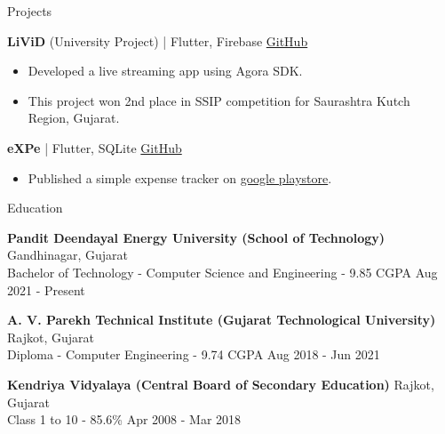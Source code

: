 \documentclass{resume}
\begin{document}
\begin{rSection}{Projects}
    \item \textbf{LiViD} (University Project) | {Flutter, Firebase}
    \hfill \href{https://github.com/JayNakum/LiViD}{GitHub}
    \begin{itemize}
        \setlength\itemsep{-0.5em}
        \item Developed a live streaming app using Agora SDK.
        \item This project won 2nd place in SSIP competition for Saurashtra Kutch Region, Gujarat.
    \end{itemize}

    \item \textbf{eXPe} | {Flutter, SQLite}
    \hfill \href{https://github.com/JayNakum/eXPe}{GitHub}
    \begin{itemize}
        \setlength\itemsep{-0.5em}
        \item Published a simple expense tracker on \href{https://play.google.com/store/apps/details?id=io.github.jaynakum.expe&pcampaignid=pcampaignidMKT-Other-global-all-co-prtnr-py-PartBadge-Mar2515-1}{google playstore}.
    \end{itemize}
\end{rSection}

\begin{rSection}{Education}
\vspace{-1em}
    \item \textbf{Pandit Deendayal Energy University (School of Technology)}
    \hfill Gandhinagar, Gujarat
    \\ Bachelor of Technology - Computer Science and Engineering - 9.85 CGPA
    \hfill {Aug 2021 - Present}

    \item \textbf{A. V. Parekh Technical Institute (Gujarat Technological University)}
    \hfill Rajkot, Gujarat
    \\ Diploma - Computer Engineering - 9.74 CGPA
    \hfill {Aug 2018 - Jun 2021}

    \item \textbf{Kendriya Vidyalaya (Central Board of Secondary Education)}
    \hfill Rajkot, Gujarat
    \\ Class 1 to 10 - 85.6\% 
    \hfill {Apr 2008 - Mar 2018}
\end{rSection}
\end{document}
